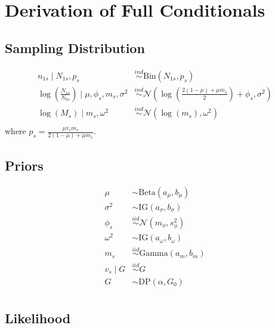 \documentclass[12pt]{article}
\newcommand{\bc}{\mbox{\boldmath $c$}}
\newcommand{\Binom}{\mbox{Bin}}
\newcommand{\iid}{\stackrel{iid}{\sim}}
\begin{document}
\newpage
\newcommand{\ind}{\overset{ind}{\sim}}
\newcommand{\p}[1]{\left(#1\right)}
\newcommand{\bk}[1]{\left[#1\right]}
\renewcommand{\bc}[1]{ \left\{#1\right\} }
\newcommand{\abs}[1]{ \left|#1\right| }
\newcommand{\norm}[1]{ \left|\left|#1\right|\right| }
\newcommand{\N}{ \mathcal N }
\renewcommand{\L}{ \mathcal L }
\newcommand{\ds}{ \displaystyle }
\newcommand{\sums}{\sum_{s=1}^S}
\newcommand{\prods}{\prod_{s=1}^S}
\allowdisplaybreaks

\section{Derivation of Full Conditionals}
\subsection{Sampling Distribution}

\begin{align*}
  n_{1s} \mid N_{1s}, p_{s} &\ind \Binom(N_{1s}, p_{s}) \\
  \log\p{\frac{N_{1s}}{N_{0s}}} \mid \mu, \phi_s, m_s, \sigma^2 &\ind \N\p{\log\p{\frac{2(1-\mu)+\mu m_s}{2}}+\phi_s, \sigma^2}\\
\log(M_s) \mid m_s, \omega^2 &\ind \N\p{\log(m_s),\omega^2} \\
\end{align*}
where $p_s = \ds\frac{\mu v_s m_s}{2(1-\mu)+\mu m_s}$.

\subsection{Priors}
\begin{align*}
\mu &\sim \text{Beta}(a_\mu,b_\mu)\\
\sigma^2 &\sim \text{IG}(a_\sigma,b_\sigma)\\
\phi_s &\iid \mathcal{N}(m_\phi,s^2_\phi) \\
\omega^2 &\sim \text{IG}(a_\omega,b_\omega)\\
m_s &\iid \text{Gamma}(a_m,b_m) \\
v_s \mid G &\iid G \\
G &\sim \text{DP}(\alpha,G_0) \\
\end{align*}

\subsection{Likelihood}
\def\LOne{\mathcal{L}_1(\mu,v_s~|~n_{1s},N_{1s},m_{s})}
\def\LTwo{\mathcal{L}_2(\mu,\phi_s,\sigma^2~|~N_{1s},N_{0s},m_{s})}
\def\LThree{\mathcal{L}_3(m_s,\omega^2~|~M_{s})}
\end{document}
